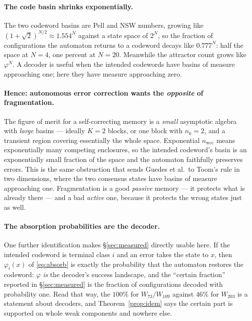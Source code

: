\documentclass[11pt]{article}
\theoremstyle{plain}
\theoremstyle{definition}
\theoremstyle{remark}
\begin{document}
\paragraph{The code basin shrinks exponentially.} The two codeword basins are
Pell and NSW numbers, growing like $(1+\sqrt2)^{N/2} \approx 1.554^N$ against a
state space of $2^N$, so the fraction of configurations the automaton returns to
a codeword decays like $0.777^N$: half the space at $N=4$, one percent at
$N=20$. Meanwhile the attractor count grows like $\varphi^N$. A decoder is
useful when the intended codewords have basins of measure approaching one; here
they have measure approaching zero.

\paragraph{Hence: autonomous error correction wants the \emph{opposite} of
fragmentation.} The figure of merit for a self-correcting memory is a
\emph{small} asymptotic algebra with \emph{large} basins --- ideally $K = 2$
blocks, or one block with $n_k = 2$, and a transient region covering
essentially the whole space. Exponential $n_{\mathrm{wcc}}$ means exponentially
many competing enclosures, so the intended codeword's basin is an exponentially
small fraction of the space and the automaton faithfully preserves errors. This
is the same obstruction that sends Guedes et al.\ to Toom's rule in two
dimensions, where the two consensus states have basins of measure approaching
one. Fragmentation is a good \emph{passive} memory --- it protects what is
already there --- and a bad \emph{active} one, because it protects the wrong
states just as well.

\paragraph{The absorption probabilities are the decoder.} One further
identification makes \S\ref{sec:measured} directly usable here. If the intended
codeword is terminal class $i$ and an error takes the state to $x$, then
$\varphi_i(x)$ of \eqref{eq:absorb} is exactly the probability that the
automaton restores the codeword: $\varphi$ \emph{is} the decoder's success
landscape, and the ``certain fraction'' reported in \S\ref{sec:measured} is the
fraction of configurations decoded with probability one. Read that way, the
$100\%$ for $W_{73}/W_{109}$ against $46\%$ for $W_{203}$ is a statement about
decoders, and Theorem~\ref{prop:idem} says the certain part is supported on
whole weak components and nowhere else.
\end{document}
